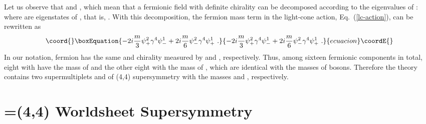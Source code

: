 \documentclass[a4paper,12pt]{article}
\begin{document}
Let us observe that \coordHE{} and \coordHE{}, which mean that a fermionic field with definite
\coordHE{} chirality can be decomposed according to the eigenvalues of
\coordHE{}: \coordHE{} where \coordHE{} are
eigenstates of \coordHE{}, that is, \coordHE{}.  With this decomposition, the fermion mass term in
the light-cone action, Eq.~(\ref{lc-action}), can be rewritten as
\begin{equation}\coord{}\boxEquation{
-2i \frac{m}{3} \psi^2_+ \gamma^4 \psi^1_-
+2i \frac{m}{6} \psi^2_- \gamma^4 \psi^1_+ ~.
}{
-2i \frac{m}{3} \psi^2_+ \gamma^4 \psi^1_-
+2i \frac{m}{6} \psi^2_- \gamma^4 \psi^1_+ ~.
}{ecuacion}\coordE{}\end{equation}
In our notation, fermion has the same \coordHE{}
and \coordHE{} chirality measured by \coordHE{} and \coordHE{},
respectively.  Thus, among sixteen fermionic components in total,
eight with \coordHE{} have the mass of \coordHE{} and the other
eight with \coordHE{} the mass of \coordHE{}, which are identical
with the masses of bosons. Therefore the theory contains two
supermultiplets \coordHE{} and \coordHE{} of (4,4) supersymmetry with the masses \coordHE{} and \coordHE{},
respectively.




\section{\coordHE{}=(4,4) Worldsheet Supersymmetry}
\end{document}
